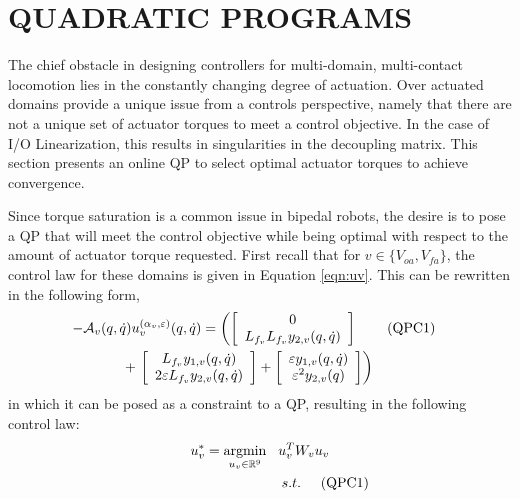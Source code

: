 \section{\uppercase{Quadratic Programs}}
\label{sec:QP}

The chief obstacle in designing controllers for multi-domain, multi-contact locomotion lies in the constantly changing degree of actuation. Over actuated domains provide a unique issue from a controls perspective, namely that there are not a unique set of actuator torques to meet a control objective. In the case of I/O Linearization, this results in singularities in the decoupling matrix. This section presents an online QP to select optimal actuator torques to achieve convergence.

Since torque saturation is a common issue in bipedal robots, the desire is to pose a QP that will meet the control objective while being optimal with respect to the amount of actuator torque requested. First recall that for $v \in \{V_{oa},V_{fa}\}$,  the control law for these domains is given in Equation \eqref{eqn:uv}. This can be rewritten in the following form,
\begin{align}
\hspace{-3mm}-\indexbyvertex{\decouplingmatrix}(\q,\dq)\indexbyvertex{\control^{(\param_{v},\controlgain)}}(\q,\dq)& = \left( \left[ \begin{array}{c} 0 \\ L_{f_v}L_{f_v}\ytwo(\q, \dq) \end{array} \right]\right. \tag{QPC1} \\ 
& \hspace{-20mm}+ \left.\left[ \begin{array}{c} L_{f_v}\yone(\q, \dq) \\ 2 \controlgain L_{f_v}\ytwo(\q, \dq) \end{array} \right] + \left[ \begin{array}{c} \controlgain \yone(\q,\dq) \\ \controlgain^2 \ytwo(\q) \end{array} \right] \right) \nonumber
\end{align}
in which it can be posed as a constraint to a QP, resulting in the following control law:
\begin{align}
  u^{*}_{v} = \underset{u_{v} \in \mathbb{R}^{9}}{\mathrm{argmin}} \hspace{3mm} u^{T}_{v}W_{v} u_{v} \hspace{0mm} \\
 s.t. \hspace{5mm} \mathrm{(QPC1)} \hspace{-10mm} \nonumber
\end{align}

